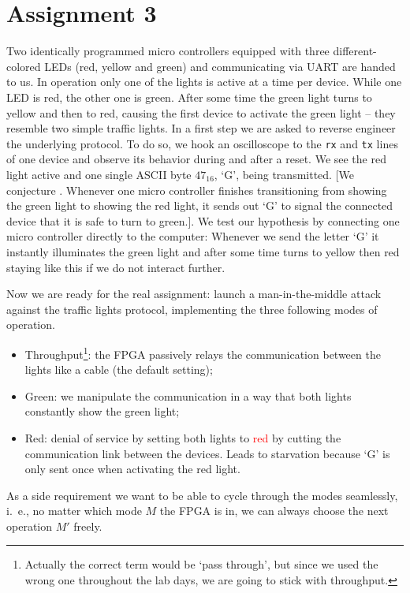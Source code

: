 \section*{Assignment 3}
Two identically programmed micro controllers equipped with three different-colored LEDs (red, yellow and green) and communicating via UART are handed to us. In operation only one of the lights is active at a time per device. While one LED is red, the other one is green. After some time the green light turns to yellow and then to red, causing the first device to activate the green light -- they resemble two simple traffic lights. In a first step we are asked to reverse engineer the underlying protocol. To do so, we hook an oscilloscope to the \texttt{rx} and \texttt{tx} lines of one device and observe its behavior during and after a reset. We see the red light active and one single ASCII byte $47_{16}$, `G', being transmitted. [We conjecture . Whenever one micro controller finishes transitioning from showing the green light to showing the red light, it sends out `G' to signal the connected device that it is safe to turn to green.]. We test our hypothesis by connecting one micro controller directly to the computer: Whenever we send the letter `G' it instantly illuminates the green light and after some time turns to yellow then red staying like this if we do not interact further.

Now we are ready for the real assignment: launch a man-in-the-middle attack against the traffic lights protocol, implementing the three following modes of operation.

\begin{itemize}
    \item[] \textsf{Throughput}\footnote{Actually the correct term would be `pass through', but since we used the wrong one throughout the lab days, we are going to stick with throughput.}: the FPGA passively relays the communication between the lights like a cable (the default setting);
    \item[] \textsf{Green}: we manipulate the communication in a way that both lights constantly show the green light;
    \item[] \textsf{Red}: denial of service by setting both lights to \textcolor{red}{red} by cutting the communication link between the devices. Leads to starvation because `G' is only sent once when activating the red light.
\end{itemize}

As a side requirement we want to be able to cycle through the modes seamlessly, i.~e., no matter which mode $M$ the FPGA is in, we can always choose the next operation $M'$ freely.

